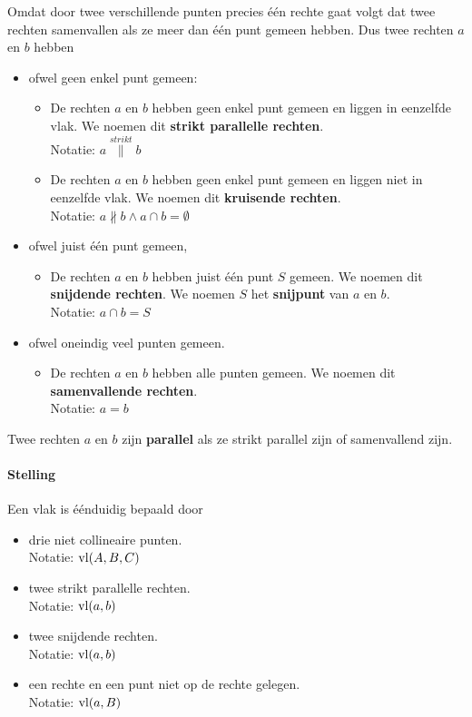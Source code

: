 \documentclass[12pt,twoside]{article}
\begin{document}
\begin{theorie}
Omdat door twee verschillende punten precies één rechte gaat volgt dat twee rechten samenvallen als ze meer dan één punt gemeen hebben. Dus twee rechten $a$ en $b$ hebben
\begin{itemize}
  \item ofwel geen enkel punt gemeen:
  \begin{itemize}
    \item De rechten $a$ en $b$ hebben geen enkel punt gemeen en liggen in eenzelfde vlak. We noemen dit {\bf strikt parallelle rechten}.\\
    Notatie: $a \overset{strikt}{\parallel} b$
    \item De rechten $a$ en $b$ hebben geen enkel punt gemeen en liggen niet in eenzelfde vlak. We noemen dit {\bf kruisende rechten}.\\
    Notatie: $a\nparallel b \wedge  a \cap b = \emptyset$
  \end{itemize}
  \item ofwel juist één punt gemeen,
  \begin{itemize}
    \item De rechten $a$ en $b$ hebben juist één punt $S$ gemeen. We noemen dit {\bf snijdende rechten}. We noemen $S$ het {\bf snijpunt} van $a$ en $b$.\\
    Notatie: $a \cap b = S$
  \end{itemize}
  \item ofwel oneindig veel punten gemeen.
  \begin{itemize}
    \item De rechten $a$ en $b$ hebben alle punten gemeen. We noemen dit {\bf samenvallende rechten}.\\
    Notatie: $a = b$
  \end{itemize}
\end{itemize}

Twee rechten $a$ en $b$ zijn {\bf parallel} als ze strikt parallel zijn of samenvallend zijn.\\

\paragraph*{Stelling}
Een vlak is éénduidig bepaald door
\begin{itemize}
  \item drie niet collineaire punten.\\
  Notatie: $\vl(A,B,C)$
  \item twee strikt parallelle rechten.\\
  Notatie: $\vl(a,b)$
  \item twee snijdende rechten.\\
  Notatie: $\vl(a,b)$
  \item een rechte en een punt niet op de rechte gelegen.\\
  Notatie: $\vl(a,B)$
\end{itemize}

\end{theorie}
\end{document}
